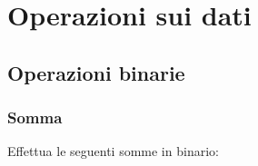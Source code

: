 \documentclass[11pt,fleqn]{book}
\begin{document}







\part{Operazioni sui dati}


\chapter{Operazioni binarie}

\section{Somma}

Effettua le seguenti somme in binario:
\end{document}
